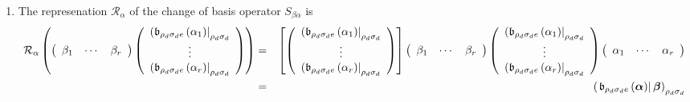 \documentclass[aps,preprint]{revtex4}
\begin{document}
\begin{enumerate}
\begin{enumerate}
\begin{enumerate}
\item The represenation $\mathcal{R}_{\alpha }$ of the change of basis
operator $S_{\beta \alpha }$ is 
\begin{eqnarray}
\mathcal{R}_{\alpha }\left( \left( 
\begin{array}{ccc}
\beta _{1} & \cdots & \beta _{r}%
\end{array}%
\right) \left( 
\begin{array}{c}
\left( \mathfrak{b}_{\rho _{d}\sigma _{d}e}\left( \alpha _{1}\right)
\right\vert _{\rho _{d}\sigma _{d}} \\ 
\vdots \\ 
\left( \mathfrak{b}_{\rho _{d}\sigma _{d}e}\left( \alpha _{r}\right)
\right\vert _{\rho _{d}\sigma _{d}}%
\end{array}%
\right) \right) &=&\left[ \left( 
\begin{array}{c}
\left( \mathfrak{b}_{\rho _{d}\sigma _{d}e}\left( \alpha _{1}\right)
\right\vert _{\rho _{d}\sigma _{d}} \\ 
\vdots \\ 
\left( \mathfrak{b}_{\rho _{d}\sigma _{d}e}\left( \alpha _{r}\right)
\right\vert _{\rho _{d}\sigma _{d}}%
\end{array}%
\right) \right] \left( 
\begin{array}{ccc}
\beta _{1} & \cdots & \beta _{r}%
\end{array}%
\right) \left( 
\begin{array}{c}
\left( \mathfrak{b}_{\rho _{d}\sigma _{d}e}\left( \alpha _{1}\right)
\right\vert _{\rho _{d}\sigma _{d}} \\ 
\vdots \\ 
\left( \mathfrak{b}_{\rho _{d}\sigma _{d}e}\left( \alpha _{r}\right)
\right\vert _{\rho _{d}\sigma _{d}}%
\end{array}%
\right) \left( 
\begin{array}{ccc}
\alpha _{1} & \cdots & \alpha _{r}%
\end{array}%
\right) \\
&=&\left( \left. \mathfrak{b}_{\rho _{d}\sigma _{d}e}\left( \boldsymbol{%
\alpha }\right) \right\vert \boldsymbol{\beta }\right) _{\rho _{d}\sigma
_{d}}
\end{eqnarray}


\end{enumerate}
\end{enumerate}
\end{enumerate}
\end{document}
